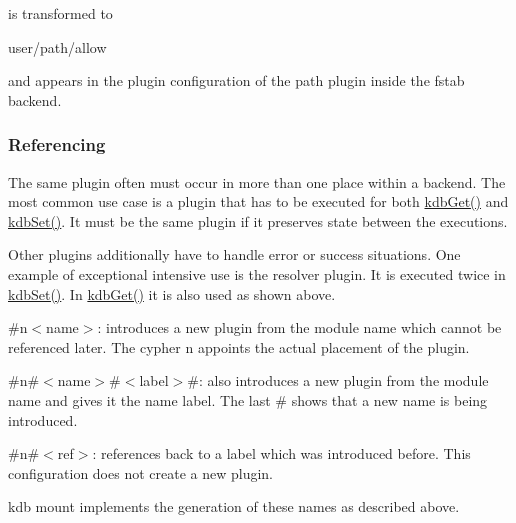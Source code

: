 

is transformed to


\begin{DoxyCode}
user/path/allow
\end{DoxyCode}


and appears in the plugin configuration of the path plugin inside the fstab backend.

\subsubsection*{Referencing}

The same plugin often must occur in more than one place within a backend. The most common use case is a plugin that has to be executed for both {\ttfamily \hyperlink{group__kdb_ga28e385fd9cb7ccfe0b2f1ed2f62453a1}{kdb\+Get()}} and {\ttfamily \hyperlink{group__kdb_ga11436b058408f83d303ca5e996832bcf}{kdb\+Set()}}. It must be the same plugin if it preserves state between the executions.

Other plugins additionally have to handle error or success situations. One example of exceptional intensive use is the resolver plugin. It is executed twice in {\ttfamily \hyperlink{group__kdb_ga11436b058408f83d303ca5e996832bcf}{kdb\+Set()}}. In {\ttfamily \hyperlink{group__kdb_ga28e385fd9cb7ccfe0b2f1ed2f62453a1}{kdb\+Get()}} it is also used as shown above.


\begin{DoxyItemize}
\item {\ttfamily \#n$<$name$>$}\+: introduces a new plugin from the module {\ttfamily name} which cannot be referenced later. The cypher {\ttfamily n} appoints the actual placement of the plugin.
\item {\ttfamily \#n\#$<$name$>$\#$<$label$>$\#}\+: also introduces a new plugin from the module {\ttfamily name} and gives it the name {\ttfamily label}. The last {\ttfamily \#} shows that a new name is being introduced.
\item {\ttfamily \#n\#$<$ref$>$}\+: references back to a label which was introduced before. This configuration does not create a new plugin.
\end{DoxyItemize}

{\ttfamily kdb mount} implements the generation of these names as described above.

